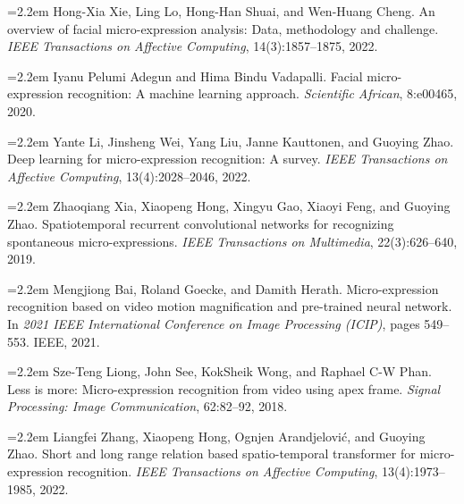 \bigskip


\medskip

{\small
\setlength{\parindent}{0pt}
\setlength{\parskip}{4pt}

\hangindent=2.2em
\makebox[2.2em][l]{[1]}Hong-Xia Xie, Ling Lo, Hong-Han Shuai, and Wen-Huang Cheng. An overview of facial micro-expression analysis: Data, methodology and challenge. \textit{IEEE Transactions on Affective Computing}, 14(3):1857--1875, 2022.

\hangindent=2.2em
\makebox[2.2em][l]{[2]}Iyanu Pelumi Adegun and Hima Bindu Vadapalli. Facial micro-expression recognition: A machine learning approach. \textit{Scientific African}, 8:e00465, 2020.

\hangindent=2.2em
\makebox[2.2em][l]{[3]}Yante Li, Jinsheng Wei, Yang Liu, Janne Kauttonen, and Guoying Zhao. Deep learning for micro-expression recognition: A survey. \textit{IEEE Transactions on Affective Computing}, 13(4):2028--2046, 2022.

\hangindent=2.2em
\makebox[2.2em][l]{[4]}Zhaoqiang Xia, Xiaopeng Hong, Xingyu Gao, Xiaoyi Feng, and Guoying Zhao. Spatiotemporal recurrent convolutional networks for recognizing spontaneous micro-expressions. \textit{IEEE Transactions on Multimedia}, 22(3):626--640, 2019.

\hangindent=2.2em
\makebox[2.2em][l]{[5]}Mengjiong Bai, Roland Goecke, and Damith Herath. Micro-expression recognition based on video motion magnification and pre-trained neural network. In \textit{2021 IEEE International Conference on Image Processing (ICIP)}, pages 549--553. IEEE, 2021.

\hangindent=2.2em
\makebox[2.2em][l]{[6]}Sze-Teng Liong, John See, KokSheik Wong, and Raphael C-W Phan. Less is more: Micro-expression recognition from video using apex frame. \textit{Signal Processing: Image Communication}, 62:82--92, 2018.

\hangindent=2.2em
\makebox[2.2em][l]{[7]}Liangfei Zhang, Xiaopeng Hong, Ognjen Arandjelovi\'{c}, and Guoying Zhao. Short and long range relation based spatio-temporal transformer for micro-expression recognition. \textit{IEEE Transactions on Affective Computing}, 13(4):1973--1985, 2022.

}
